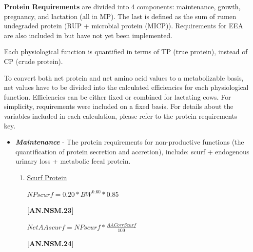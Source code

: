 \begin{refsection}
\begin{itemize}
\vspace{0.5cm}


\end{itemize}

    \textbf{ Protein Requirements} are divided into 4 components: maintenance, growth, pregnancy, and lactation (all in MP). The last is defined as the sum of rumen undegraded protein (RUP + microbial protein (MICP)). Requirements for EEA are also included in \textcite{nrc2021} but have not yet been implemented.
    \vspace{0.2cm}
    
    Each physiological function is quantified in terms of TP (true protein), instead of CP (crude protein).
    \vspace{0.2cm}
    
    To convert both net protein and net amino acid values to a metabolizable basis, net values have to be divided into the calculated efficiencies for each physiological function. Efficiencies can be either fixed or combined for lactating cows. For simplicity, requirements were included on a fixed basis. For details about the variables included in each calculation, please refer to the protein requirements key.
    \vspace{0.5cm}

\begin{itemize}
    \item \textbf{\textit{Maintenance}} - The protein requirements for non-productive functions (the quantification of protein secretion and accretion), include: scurf + endogenous urinary loss + metabolic fecal protein.
    \begin{enumerate}
        \item \underline {Scurf Protein}
        \vspace{0.2cm}

\begin{center}
    \(NPscurf = 0.20 * BW^{0.60} * 0.85\)
\end{center}

\vspace{0.5cm}
            {\raggedleft \textbf{[AN.NSM.23]}\par}
        \vspace{0.2cm}

\begin{center}
    \(NetAAscurf = NPscurf * \frac{AACorrScurf}{100}\)
\end{center}

\vspace{0.5cm}
            {\raggedleft \textbf{[AN.NSM.24]}\par}
            \vspace{0.5cm}
            

\end{enumerate}
\end{itemize}
\end{refsection}
